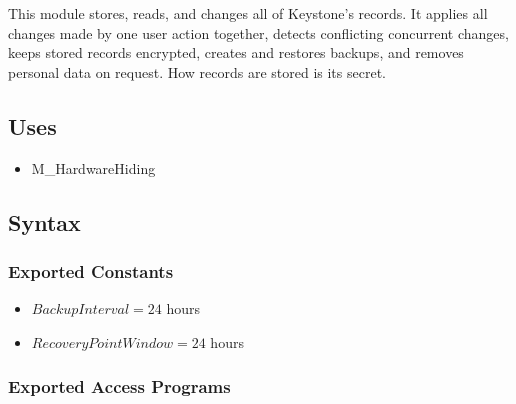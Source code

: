 \documentclass[12pt, titlepage]{article}
\begin{document}
This module stores, reads, and changes all of Keystone's records.
It applies all changes made by one user action together, detects conflicting concurrent changes,
keeps stored records encrypted, creates and restores backups, and removes personal data on request.
How records are stored is its secret.

\subsection{Uses}

\begin{itemize}
    \item M\_HardwareHiding
\end{itemize}

\subsection{Syntax}

\subsubsection{Exported Constants}
\begin{itemize}
    \item $\mathit{BackupInterval}=24$ hours
    \item $\mathit{RecoveryPointWindow}=24$ hours
\end{itemize}

\subsubsection{Exported Access Programs}
\end{document}
